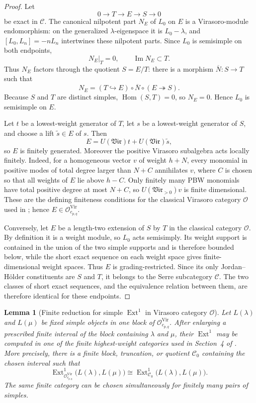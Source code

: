 \documentclass[12pt,leqno]{amsart}
\numberwithin{equation}{section}
\newtheorem{lem}[thm]{Lemma}
\newcommand{\Hom}{\operatorname{Hom}}
\newcommand{\Ext}{\operatorname{Ext}}
\newcommand{\Vir}{\mathfrak{Vir}}
\begin{document}
\begin{proof}
Let
\[
 0\longrightarrow T\longrightarrow E\longrightarrow S\longrightarrow0
\]
be exact in $\mathscr C$.  The canonical nilpotent part $N_E$ of $L_0$ on $E$ is a
Virasoro-module endomorphism: on the generalized $\lambda$-eigenspace it
is $L_0-\lambda$, and $[L_0,L_n]=-nL_n$ intertwines these nilpotent
parts.  Since $L_0$ is semisimple on both endpoints,
\[
 N_E|_T=0,\qquad \operatorname{Im}N_E\subset T.
\]
Thus $N_E$ factors through the quotient $S=E/T$: there is a morphism
$\overline N:S\to T$ such that
\[
 N_E=(T\hookrightarrow E)\circ\overline N\circ(E\twoheadrightarrow S).
\]
Because $S$ and $T$ are distinct simples, $\Hom(S,T)=0$, so $N_E=0$.
Hence $L_0$ is semisimple on $E$.

Let $t$ be a lowest-weight generator of $T$, let $s$ be a lowest-weight
generator of $S$, and choose a lift $\widetilde s\in E$ of $s$.  Then
\[
 E=U(\Vir)t+U(\Vir)\widetilde s,
\]
so $E$ is finitely generated.  Moreover the positive Virasoro
subalgebra acts locally finitely.  Indeed, for a homogeneous vector
$v$ of weight $h+N$, every monomial in positive modes of total degree
larger than $N+C$ annihilates $v$, where $C$ is chosen so that all
weights of $E$ lie above $h-C$.  Only finitely many PBW monomials have
total positive degree at most $N+C$, so $U(\Vir_{>0})v$ is finite
dimensional.  These are the defining finiteness conditions for the classical Virasoro
category $\mathcal O$ used in \cite[Section~2.2]{BoeNakanoWiesner}; hence
$E\in\mathcal O^{\mathrm{Vir}}_{c_{p,q}}$.

Conversely, let $E$ be a length-two extension of $S$ by $T$ in the
classical category $\mathcal O$.  By definition it is a weight module,
so $L_0$ acts semisimply.  Its weight support is contained in the union
of the two simple supports and is therefore bounded below, while the
short exact sequence on each weight space gives finite-dimensional
weight spaces.  Thus $E$ is grading-restricted.  Since its only
Jordan--H\"older constituents are $S$ and $T$, it belongs to the Serre
subcategory $\mathscr C$.  The two classes of short exact sequences,
and the equivalence relation between them, are therefore identical for
these endpoints.
\end{proof}

\begin{lem}[Finite reduction for simple $\Ext^1$ in Virasoro category $\mathcal O$]
\label{lem:BNW-finite-reduction}
Let $L(\lambda)$ and $L(\mu)$ be fixed simple objects in one block of
$\mathcal O^{\mathrm{Vir}}_{c_{p,q}}$.  After enlarging a prescribed
finite interval of the block containing $\lambda$ and $\mu$, their
$\Ext^1$ may be computed in one of the finite highest-weight categories
used in Section~4 of \cite{BoeNakanoWiesner}.  More precisely, there is
a finite block, truncation, or quotient $\mathcal C_0$ containing the
chosen interval such that
\[
 \Ext^1_{\mathcal O^{\mathrm{Vir}}_{c_{p,q}}}
   \bigl(L(\lambda),L(\mu)\bigr)
 \cong
 \Ext^1_{\mathcal C_0}
   \bigl(L(\lambda),L(\mu)\bigr).
\]
The same finite category can be chosen simultaneously for finitely many
pairs of simples.
\end{lem}
\end{document}
